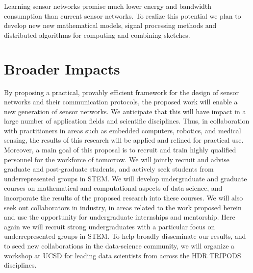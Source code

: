 \documentclass{article}
\begin{document}
Learning sensor networks promise much lower energy and bandwidth
consumption than current sensor networks. To realize this potential we
plan to develop new new mathematical models, signal processing methods
and distributed algorithms for computing and combining sketches.
\fi



\section{Broader Impacts}
By proposing a practical, provably efficient  framework for the design of sensor networks and their communication protocols, the proposed work will enable a new generation of sensor networks. We anticipate that this will have impact in a large number of application fields and scientific disciplines. Thus, in collaboration with practitioners in areas such as embedded computers, robotics, and medical sensing, the results of this research will be applied and refined for practical use. 
Moreover, a main goal of this proposal is to recruit and train highly qualified personnel for the workforce of tomorrow. We will jointly recruit and advise graduate and post-graduate students, and actively seek students from underrepresented groups in STEM. We will develop undergraduate and graduate courses on mathematical and computational aspects of data science, and incorporate the
results of the proposed research into these courses. We will also seek out collaborators in industry, in areas related to the work proposed herein and use the opportunity for undergraduate internships and mentorship. Here again we will recruit strong undergraduates with a particular focus on underrepresented groups in STEM.
To help broadly disseminate our results, and to seed new collaborations in the data-science community, we will organize a workshop at UCSD for leading data scientists from across the HDR TRIPODS disciplines. 
\end{document}
